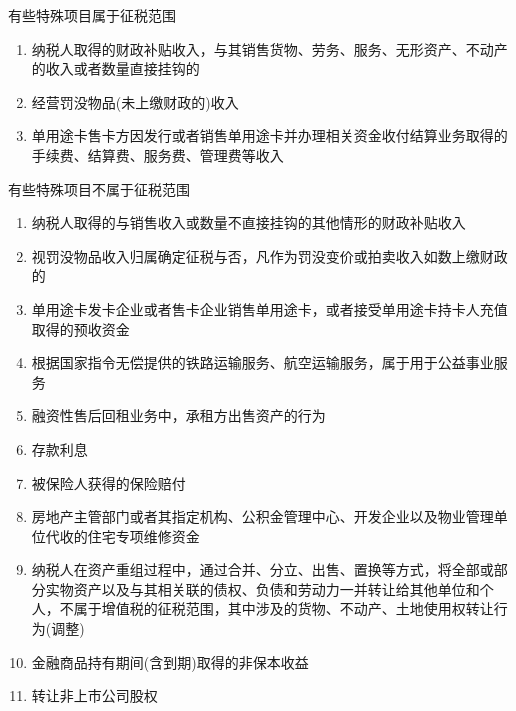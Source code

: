\documentclass[UTF8,12pt]{ctexart}
\numberwithin{equation}{section} %
\numberwithin{figure}{section}
\numberwithin{table}{section}
\begin{document}
	有些特殊项目属于征税范围
	\begin{enumerate}
		\item 纳税人取得的财政补贴收入，与其销售货物、劳务、服务、无形资产、不动产的收入或者数量直接挂钩的
		
		\item 经营罚没物品(未上缴财政的)收入
		
		\item 单用途卡售卡方因发行或者销售单用途卡并办理相关资金收付结算业务取得的手续费、结算费、服务费、管理费等收入
	\end{enumerate}
	
	有些特殊项目不属于征税范围
	\begin{enumerate}
		\item 纳税人取得的与销售收入或数量不直接挂钩的其他情形的财政补贴收入
		
		\item 视罚没物品收入归属确定征税与否，凡作为罚没变价或拍卖收入如数上缴财政的
		
		\item 单用途卡发卡企业或者售卡企业销售单用途卡，或者接受单用途卡持卡人充值取得的预收资金
		
		\item 根据国家指令无偿提供的铁路运输服务、航空运输服务，属于用于公益事业服务
		
		\item 融资性售后回租业务中，承租方出售资产的行为
		
		\item 存款利息
		
		\item 被保险人获得的保险赔付
		
		\item 房地产主管部门或者其指定机构、公积金管理中心、开发企业以及物业管理单位代收的住宅专项维修资金
		
		\item 纳税人在资产重组过程中，通过合并、分立、出售、置换等方式，将全部或部分实物资产以及与其相关联的债权、负债和劳动力一并转让给其他单位和个人，不属于增值税的征税范围，其中涉及的货物、不动产、土地使用权转让行为(调整)
		
		\item 金融商品持有期间(含到期)取得的非保本收益
		
		\item 转让非上市公司股权
	\end{enumerate}
	
\end{document}
